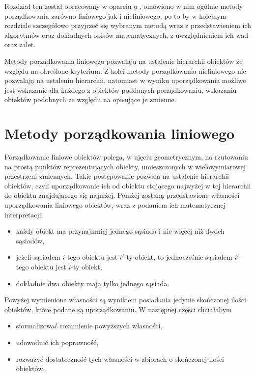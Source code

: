 \documentclass[12pt,a4paper]{report}
\begin{document}
Rozdział ten został opracowany w oparciu o \cite[Rozdział 2]{panek2013}, omówiono w nim ogólnie metody porządkowania zarówno liniowego jak i nieliniowego, po to by w kolejnym rozdziale szczegółowo przyjrzeć się wybranym metodą wraz z przedstawieniem ich algorytmów oraz dokładnych opisów matematycznych, z uwzględnieniem ich wad oraz zalet.


Metody porządkowania liniowego pozwalają na ustalenie hierarchii obiektów ze względu na określone kryterium. Z kolei metody porządkowania nieliniowego nie pozwalają na ustaleniu hierarchii, natomiast w wyniku uporządkowania możliwe jest wskazanie dla każdego z obiektów poddanych porządkowaniu, wskazaniu obiektów podobnych ze względu na opisujące je zmienne. 

\section{Metody porządkowania liniowego}
\noindent

Porządkowanie liniowe obiektów polega, w ujęciu geometrycznym, na rzutowaniu na prostą punktów reprezentujących obiekty, umieszczonych w wielowymiarowej przestrzeni zmiennych. Takie postępowanie pozwala na ustalenie hierarchii obiektów, czyli uporządkowanie ich od obiektu stojącego najwyżej w tej hierarchii do obiektu znajdującego się najniżej. Poniżej zostaną przedstawione własności uporządkowania liniowego obiektów, wraz z podaniem ich matematycznej interpretacji.

\begin{itemize}
\item każdy obiekt ma przynajmniej jednego sąsiada i nie więcej niż dwóch sąsiadów,
\item jeżeli sąsiadem $i$-tego obiektu jest $i'$-ty obiekt, to jednocześnie sąsiadem $i'$-tego obiektu jest $i$-ty obiekt,
\item dokładnie dwa obiekty mają tylko jednego sąsiada.
\end{itemize}
\noindent

Powyżej wymienione własności są wynikiem posiadania jedynie skończonej ilości obiektów, które podane są uporządkowaniu. W następnej części chciałabym 
\begin{itemize}
\item sformalizować rozumienie powyższych własności,
\item udowodnić ich poprawność,
\item rozważyć dostateczność tych własności w zbiorach o skończonej ilości obiektów.
\end{itemize}
\end{document}
